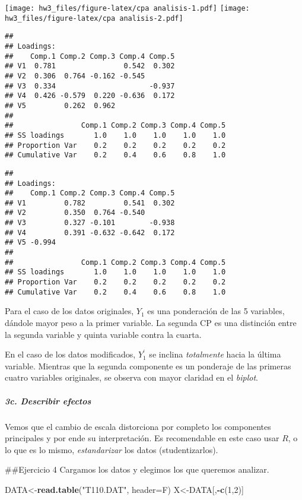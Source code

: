 \documentclass[]{article}
\newenvironment{Shaded}{\begin{snugshade}}{\end{snugshade}}
\newcommand{\DataTypeTok}[1]{\textcolor[rgb]{0.13,0.29,0.53}{#1}}
\newcommand{\DecValTok}[1]{\textcolor[rgb]{0.00,0.00,0.81}{#1}}
\newcommand{\KeywordTok}[1]{\textcolor[rgb]{0.13,0.29,0.53}{\textbf{#1}}}
\newcommand{\NormalTok}[1]{#1}
\newcommand{\OperatorTok}[1]{\textcolor[rgb]{0.81,0.36,0.00}{\textbf{#1}}}
\newcommand{\StringTok}[1]{\textcolor[rgb]{0.31,0.60,0.02}{#1}}
\let\oldsubparagraph\subparagraph
\renewcommand{\subparagraph}[1]{\oldsubparagraph{#1}\mbox{}}
\begin{document}
\texttt{[image: hw3\_files/figure-latex/cpa analisis-1.pdf]}
\texttt{[image: hw3\_files/figure-latex/cpa analisis-2.pdf]}

\begin{verbatim}
## 
## Loadings:
##    Comp.1 Comp.2 Comp.3 Comp.4 Comp.5
## V1  0.781                0.542  0.302
## V2  0.306  0.764 -0.162 -0.545       
## V3  0.334                      -0.937
## V4  0.426 -0.579  0.220 -0.636  0.172
## V5         0.262  0.962              
## 
##                Comp.1 Comp.2 Comp.3 Comp.4 Comp.5
## SS loadings       1.0    1.0    1.0    1.0    1.0
## Proportion Var    0.2    0.2    0.2    0.2    0.2
## Cumulative Var    0.2    0.4    0.6    0.8    1.0
\end{verbatim}

\begin{verbatim}
## 
## Loadings:
##    Comp.1 Comp.2 Comp.3 Comp.4 Comp.5
## V1         0.782         0.541  0.302
## V2         0.350  0.764 -0.540       
## V3         0.327 -0.101        -0.938
## V4         0.391 -0.632 -0.642  0.172
## V5 -0.994                            
## 
##                Comp.1 Comp.2 Comp.3 Comp.4 Comp.5
## SS loadings       1.0    1.0    1.0    1.0    1.0
## Proportion Var    0.2    0.2    0.2    0.2    0.2
## Cumulative Var    0.2    0.4    0.6    0.8    1.0
\end{verbatim}

Para el caso de los datos originales, \(Y_{1}\) es una ponderación de
las 5 variables, dándole mayor peso a la primer variable. La segunda CP
es una distinción entre la segunda variable y quinta variable contra la
cuarta.

En el caso de los datos modificados, \(Y_{1}^{'}\) se inclina
\emph{totalmente} hacia la última variable. Mientras que la segunda
componente es un ponderaje de las primeras cuatro variables originales,
se observa con mayor claridad en el \emph{biplot}.

\hypertarget{c.-describir-efectos}{%
\subparagraph{3c. Describir efectos}\label{c.-describir-efectos}}

Vemos que el cambio de escala distorciona por completo los componentes
principales y por ende su interpretación. Es recomendable en este caso
usar \(R\), o lo que es lo mismo, \emph{estandarizar} los datos
(studentizarlos).

\#\#Ejercicio 4 Cargamos los datos y elegimos los que queremos analizar.

\begin{Shaded}
\begin{Highlighting}[]
\NormalTok{DATA<-}\KeywordTok{read.table}\NormalTok{(}\StringTok{"T110.DAT"}\NormalTok{, }\DataTypeTok{header=}\NormalTok{F)}
\NormalTok{X<-DATA[,}\OperatorTok{-}\KeywordTok{c}\NormalTok{(}\DecValTok{1}\NormalTok{,}\DecValTok{2}\NormalTok{)]}
\end{Highlighting}
\end{Shaded}
\end{document}

